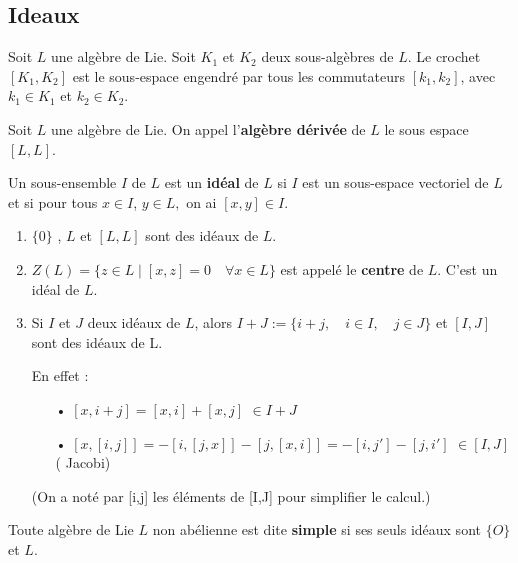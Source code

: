 \documentclass[a4paper,openany,12pt]{report}
\theoremstyle{break}
{\theorembodyfont{\upshape}
\newtheorem*{rmq}{Remarque :}
\newtheorem*{prv}{Preuve :}
\newtheorem*{ex}{Exemples :}
\newtheorem*{exe}{Exemple : }
\newtheorem*{nota}{Notation :}
\newtheorem*{dem}{D\'emonstration :}}
\begin{document}
\subsection{Ideaux}

\begin{df}
\quad Soit $L$ une algèbre de Lie. Soit $K_1$ et $K_2$ deux sous-algèbres de $L$. Le crochet $[K_1,K_2]$ est le sous-espace engendré par tous les commutateurs $[k_1,k_2]$, avec $k_1 \in K_1$ et $k_2 \in K_2$.
\end{df}

\begin{df}
\quad Soit $L$ une algèbre de Lie. On appel l'\textbf{algèbre dérivée} de $L$ le sous espace $[L,L]$.
\end{df}

\begin{df}
\quad Un sous-ensemble $I$ de $L$ est un \textbf{idéal} de $L$ si $I$ est un sous-espace vectoriel de $L$ et si pour tous $x \in I$, $y \in L,$ on ai $[x, y] \in I$.
\end{df}

\begin{ex}
\begin{enumerate}
\item $\{0 \}$ , $L$ et $[L,L]$ sont des idéaux de $L$.

\item $Z(L) = \{ z \in L  \mid [x,z]=0 \quad \forall x \in L\}$ est appelé le \textbf{centre} de $L$. C'est un idéal de $L$.

\item Si $I$ et $J$ deux idéaux de $L$, alors $I+J:=\{i+j,\quad i\in I,\quad j\in J\}$ et $[I,J]$ sont des idéaux de L.

En effet :
\begin{itemize}
\item[•] $[x,i+j]=[x,i]+[x,j]$ $\in I+J$
\item[•]$[x,[i,j]]=-[i,[j,x]]-[j,[x,i]] = -[i,j']-[j,i']$ $\in [I,J]$ ( Jacobi)
\end{itemize}
(On a noté par [i,j] les éléments de [I,J] pour simplifier le calcul.)
\end{enumerate}
\end{ex}

\begin{df}
\quad Toute algèbre de Lie $L$ non abélienne est dite \textbf{simple} si ses seuls idéaux sont $\{O\}$ et $L$.
\end{df}
\end{document}
